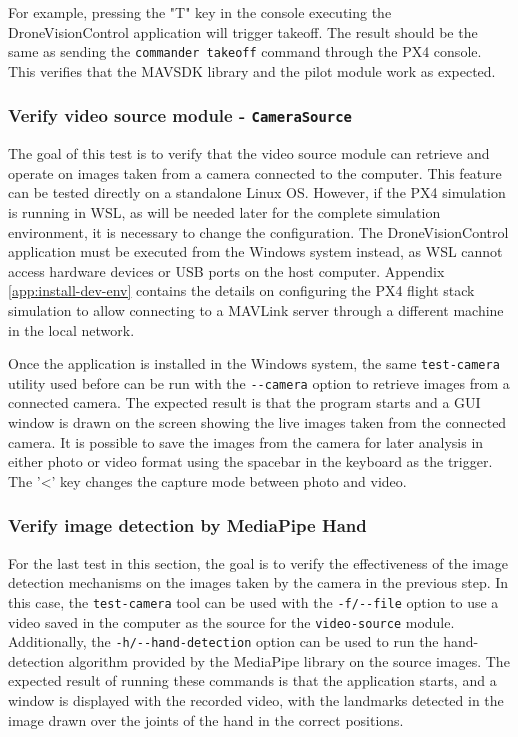 For example, pressing the "T" key in the console executing the DroneVisionControl application will trigger takeoff. The result should be the same as sending the \texttt{commander takeoff} command through the PX4 console. This verifies that the MAVSDK library and the pilot module work as expected.

\subsubsection{Verify video source module - \texttt{CameraSource}}

The goal of this test is to verify that the video source module can retrieve and operate on images taken from a camera connected to the computer. This feature can be tested directly on a standalone Linux OS. However, if the PX4 simulation is running in WSL, as will be needed later for the complete simulation environment, it is necessary to change the configuration. The DroneVisionControl application must be executed from the Windows system instead, as WSL cannot access hardware devices or USB ports on the host computer. Appendix \ref{app:install-dev-env} contains the details on configuring the PX4 flight stack simulation to allow connecting to a MAVLink server through a different machine in the local network.

Once the application is installed in the Windows system, the same \texttt{test-camera} utility used before can be run with the \texttt{-{}-camera} option to retrieve images from a connected camera. The expected result is that the program starts and a GUI window is drawn on the screen showing the live images taken from the connected camera. It is possible to save the images from the camera for later analysis in either photo or video format using the spacebar in the keyboard as the trigger. The '<' key changes the capture mode between photo and video.

\subsubsection{Verify image detection by MediaPipe Hand}

For the last test in this section, the goal is to verify the effectiveness of the image detection mechanisms on the images taken by the camera in the previous step. In this case, the \texttt{test-camera} tool can be used with the \texttt{-f/-{}-file} option to use a video saved in the computer as the source for the \texttt{video-source} module. Additionally, the \texttt{-h/-{}-hand-detection} option can be used to run the hand-detection algorithm provided by the MediaPipe library on the source images. The expected result of running these commands is that the application starts, and a window is displayed with the recorded video, with the landmarks detected in the image drawn over the joints of the hand in the correct positions.


